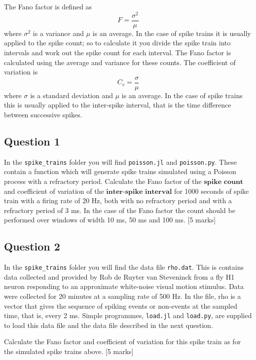 \documentclass[12pt]{article}
\begin{document}
The Fano factor is defined as
\begin{equation}
F=\frac{\sigma^2}{\mu}
\end{equation}
where $\sigma^2$ is a variance and $\mu$ is an average.  In the
case of spike trains it is usually applied to the spike count; so to
calculate it you divide the spike train into intervals and work out
the spike count for each interval. The Fano factor is calculated using
the average and variance for these counts. The coefficient of variation is 
\begin{equation}
C_v=\frac{\sigma}{\mu}
\end{equation}
where $\sigma$ is a standard deviation and $\mu$ is an average. In the
case of spike trains this is usually applied to the inter-spike
interval, that is the time difference between successive spikes.

\subsection*{Question 1}

In the \texttt{spike\_trains} folder you will find
\texttt{poisson.jl} and \texttt{poisson.py}. These contain a function
which will generate spike trains simulated using a Poisson process
with a refractory period. Calculate the Fano factor of the $\textbf{spike count}$
and coefficient of variation of the $\textbf{inter-spike interval}$ for 1000
seconds of spike train with a firing rate of 20 Hz, both with no
refractory period and with a refractory period of 3 ms. In the case of
the Fano factor the count should be performed over windows of width 10
ms, 50 ms and 100 ms. [5 marks]

\subsection*{Question 2}

In the \texttt{spike\_trains} folder you will find the data file
\texttt{rho.dat}. This is contains data collected and provided by Rob
de Ruyter van Steveninck from a fly H1 neuron responding to an
approximate white-noise visual motion stimulus. Data were collected
for 20 minutes at a sampling rate of 500 Hz. In the file, rho is a
vector that gives the sequence of spiking events or non-events at the
sampled time, that is, every 2 ms. Simple programmes, \texttt{load.jl}
and \texttt{load.py}, are supplied to load this data file and the data
file described in the next question.

Calculate the Fano factor and coefficient of variation for this spike
train as for the simulated spike trains above. [5 marks]
\end{document}
